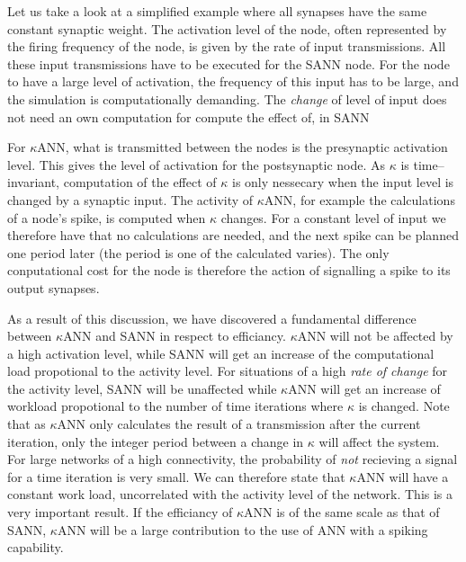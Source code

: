 Let us take a look at a simplified example where all synapses have the same constant synaptic weight.
The activation level of the node, often represented by the firing frequency of the node, is given by the rate of input transmissions.
All these input transmissions have to be executed for the SANN node.
For the node to have a large level of activation, the frequency of this input has to be large, and the simulation is computationally demanding.
The \emph{change} of level of input does not need an own computation for compute the effect of, in SANN

For $\kappa$ANN, what is transmitted between the nodes is the presynaptic activation level.
This gives the level of activation for the postsynaptic node.
As $\kappa$ is time--invariant, computation of the effect of $\kappa$ is only nessecary when the input level is changed by a synaptic input.
The activity of $\kappa$ANN, for example the calculations of a node's spike, is computed when $\kappa$ changes.
For a constant level of input we therefore have that no calculations are needed, and the next spike can be planned one period later (the period is one of the calculated varies).
The only conputational cost for the node is therefore the action of signalling a spike to its output synapses.

As a result of this discussion, we have discovered a fundamental difference between $\kappa$ANN and SANN in respect to efficiancy.
$\kappa$ANN will not be affected by a high activation level, while SANN will get an increase of the computational load propotional to the activity level.
For situations of a high \emph{rate of change} for the activity level, SANN will be unaffected while $\kappa$ANN will get an increase of workload  propotional to the number of time iterations where $\kappa$ is changed.
Note that as $\kappa$ANN only calculates the result of a transmission after the current iteration, only the integer period between a change in $\kappa$ will affect the system.
For large networks of a high connectivity, the probability of \emph{not} recieving a signal for a time iteration is very small. 
We can therefore state that $\kappa$ANN will have a constant work load, uncorrelated with the activity level of the network.
This is a very important result.
If the efficiancy of $\kappa$ANN is of the same scale as that of SANN, $\kappa$ANN will be a large contribution to the use of ANN with a spiking capability.

